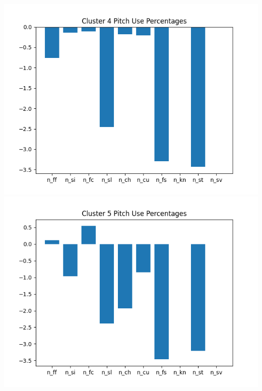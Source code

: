\documentclass[12 pt]{article}
\begin{document}
\begin{center}
\\ \includegraphics[scale=.425]{figs/pct4_8.png} \includegraphics[scale=.425]{figs/pct5_8.png}

\end{center}
\end{document}
